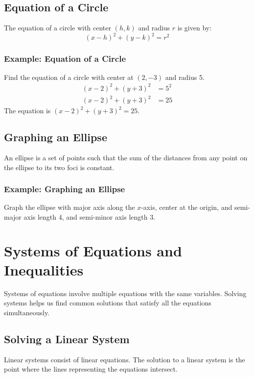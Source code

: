 \documentclass{article}
\begin{document}
\subsection{Equation of a Circle}
The equation of a circle with center $(h, k)$ and radius $r$ is given by:
\[ (x - h)^2 + (y - k)^2 = r^2 \]

\subsubsection{Example: Equation of a Circle}
Find the equation of a circle with center at $(2, -3)$ and radius 5.
\begin{align*}
    (x - 2)^2 + (y + 3)^2 &= 5^2 \\
    (x - 2)^2 + (y + 3)^2 &= 25
\end{align*}
The equation is $(x - 2)^2 + (y + 3)^2 = 25$.

\subsection{Graphing an Ellipse}
An ellipse is a set of points such that the sum of the distances from any point on the ellipse to its two foci is constant.

\subsubsection{Example: Graphing an Ellipse}
Graph the ellipse with major axis along the $x$-axis, center at the origin, and semi-major axis length 4, and semi-minor axis length 3.
\begin{center}
\end{center}

\section{Systems of Equations and Inequalities}
Systems of equations involve multiple equations with the same variables. Solving systems helps us find common solutions that satisfy all the equations simultaneously.

\subsection{Solving a Linear System}
Linear systems consist of linear equations. The solution to a linear system is the point where the lines representing the equations intersect.
\end{document}
